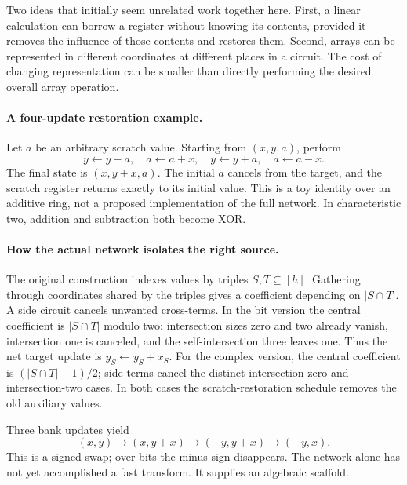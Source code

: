 
Two ideas that initially seem unrelated work together here. First, a linear
calculation can borrow a register without knowing its contents, provided it
removes the influence of those contents and restores them. Second, arrays can
be represented in different coordinates at different places in a circuit.
The cost of changing representation can be smaller than directly performing
the desired overall array operation.

\paragraph{A four-update restoration example.}
Let $a$ be an arbitrary scratch value. Starting from $(x,y,a)$, perform
\[
 y\leftarrow y-a,\quad a\leftarrow a+x,\quad
 y\leftarrow y+a,\quad a\leftarrow a-x.
\]
The final state is $(x,y+x,a)$. The initial $a$ cancels from the target, and
the scratch register returns exactly to its initial value. This is a toy
identity over an additive ring, not a proposed implementation of the full
network. In characteristic two, addition and subtraction both become XOR.


\paragraph{How the actual network isolates the right source.}
The original construction indexes values by triples $S,T\subseteq[h]$.
Gathering through coordinates shared by the triples gives a coefficient
depending on $|S\cap T|$. A side circuit cancels unwanted cross-terms. In
the bit version the central coefficient is $|S\cap T|$ modulo two:
intersection sizes zero and two already vanish, intersection one is canceled,
and the self-intersection three leaves one. Thus the net target update is
$y_S\leftarrow y_S+x_S$. For the complex version, the central coefficient
is $(|S\cap T|-1)/2$; side terms cancel the distinct intersection-zero and
intersection-two cases. In both cases the scratch-restoration schedule removes
the old auxiliary values.

Three bank updates yield
\[
 (x,y)\to(x,y+x)\to(-y,y+x)\to(-y,x).
\]
This is a signed swap; over bits the minus sign disappears. The network alone
has not yet accomplished a fast transform. It supplies an algebraic scaffold.


